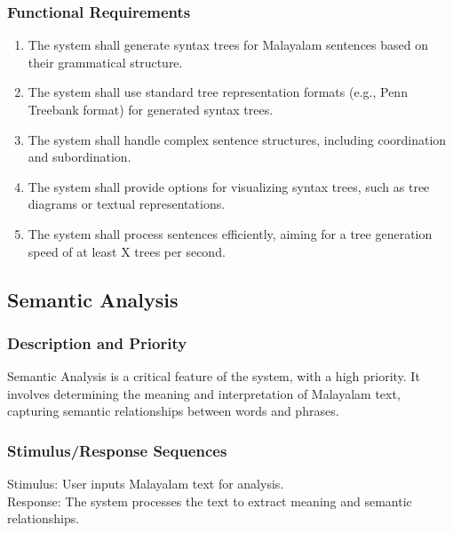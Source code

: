 \documentclass[12pt]{article}
\begin{document}
	\subsubsection{Functional Requirements}
	\begin{enumerate}
		\item The system shall generate syntax trees for Malayalam sentences based on their
		grammatical structure.
		\item The system shall use standard tree representation formats (e.g., Penn Treebank
		format) for generated syntax trees.
		\item The system shall handle complex sentence structures, including coordination and
		subordination.
		\item The system shall provide options for visualizing syntax trees, such as tree
		diagrams or textual representations.
		\item The system shall process sentences efficiently, aiming for a tree generation speed
		of at least X trees per second.
	\end{enumerate}

	\subsection{Semantic Analysis}
	
	\subsubsection{Description and Priority}
	Semantic Analysis is a critical feature of the system, with a high priority. It involves
	determining the meaning and interpretation of Malayalam text, capturing semantic
	relationships between words and phrases.
	
	\subsubsection{Stimulus/Response Sequences}
	Stimulus: User inputs Malayalam text for analysis.\\
	Response: The system processes the text to extract meaning and semantic relationships.
	
\end{document}
